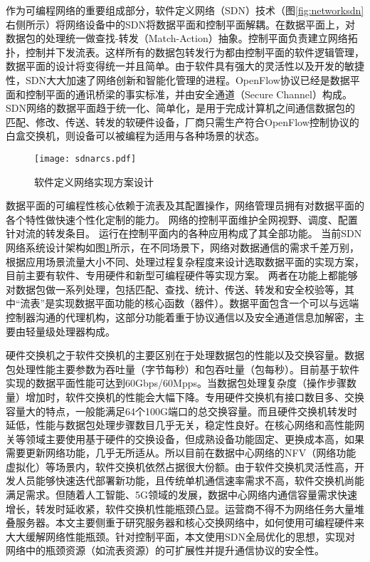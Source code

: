 作为可编程网络的重要组成部分，软件定义网络（SDN）技术（图\ref{fig:networksdn}右侧所示）将网络设备中的SDN将数据平面和控制平面解耦。在数据平面上，对数据包的处理统一做查找-转发（Match-Action）抽象。控制平面负责建立网络拓扑，控制并下发流表。这样所有的数据包转发行为都由控制平面的软件逻辑管理，数据平面的设计将变得统一并且简单。由于软件具有强大的灵活性以及开发的敏捷性，SDN大大加速了网络创新和智能化管理的进程。OpenFlow协议已经是数据平面和控制平面的通讯桥梁的事实标准，并由安全通道（Secure Channel）构成。
SDN网络的数据平面趋于统一化、简单化，是用于完成计算机之间通信数据包的匹配、修改、传送、转发的软硬件设备，厂商只需生产符合OpenFlow控制协议的白盒交换机，则设备可以被编程为适用与各种场景的状态。

\begin{figure}[!ht]
	\centering 
	\vspace{-1.5mm} 
	\texttt{[image: sdnarcs.pdf]}
	\caption{软件定义网络实现方案设计} \label{fig:sdnarcs}
\end{figure}

	

数据平面的可编程性核心依赖于流表及其配置操作，网络管理员拥有对数据平面的各个特性做快速个性化定制的能力。
网络的控制平面维护全网视野、调度、配置针对流的转发条目。
运行在控制平面内的各种应用构成了其全部功能。
当前SDN网络系统设计架构如图\ref{fig:sdnarcs}所示，在不同场景下，网络对数据通信的需求千差万别，根据应用场景流量大小不同、处理过程复杂程度来设计选取数据平面的实现方案，目前主要有软件、专用硬件和新型可编程硬件等实现方案。
两者在功能上都能够对数据包做一系列处理，包括匹配、查找、统计、传送、转发和安全校验等，其中“流表”是实现数据平面功能的核心函数（器件）。数据平面包含一个可以与远端控制器沟通的代理机构，这部分功能着重于协议通信以及安全通道信息加解密，主要由轻量级处理器构成。

硬件交换机之于软件交换机的主要区别在于处理数据包的性能以及交换容量。数据包处理性能主要参数为吞吐量（字节每秒）和包吞吐量（包每秒）。目前基于软件实现的数据平面性能可达到60Gbps/60Mpps。当数据包处理复杂度（操作步骤数量）增加时，软件交换机的性能会大幅下降。专用硬件交换机有接口数目多、交换容量大的特点，一般能满足64个100G端口的总交换容量。而且硬件交换机转发时延低，性能与数据包处理步骤数目几乎无关，稳定性良好。在核心网络和高性能网关等领域主要使用基于硬件的交换设备，但成熟设备功能固定、更换成本高，如果需要更新网络功能，几乎无所适从。所以目前在数据中心网络的NFV（网络功能虚拟化）等场景内，软件交换机依然占据很大份额。由于软件交换机灵活性高，开发人员能够快速迭代部署新功能，且传统单机通信速率需求不高，软件交换机尚能满足需求。但随着人工智能、5G领域的发展，数据中心网络内通信容量需求快速增长，转发时延收紧，软件交换机性能瓶颈凸显。运营商不得不为网络任务大量堆叠服务器。本文主要侧重于研究服务器和核心交换网络中，如何使用可编程硬件来大大缓解网络性能瓶颈。针对控制平面，本文使用SDN全局优化的思想，实现对网络中的瓶颈资源（如流表资源）的可扩展性并提升通信协议的安全性。



